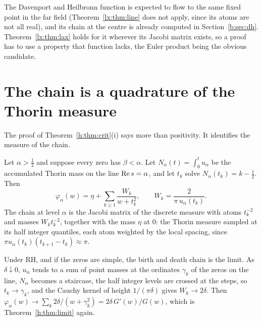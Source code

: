 The Davenport and Heilbronn function is expected to flow to the same fixed point in the far field (Theorem~\ref{lx:thm:line} does not apply, since its atoms are not all real), and its chain at the centre is already computed in Section~\ref{b:sec:dh}. Theorem~\ref{lx:thm:lax} holds for it wherever its Jacobi matrix exists, so a proof has to use a property that function lacks, the Euler product being the obvious candidate.

\section{The chain is a quadrature of the Thorin measure}

The proof of Theorem~\ref{h:thm:crit}(i) says more than positivity. It identifies the measure of the chain.

\begin{theorem}[Quadrature]\label{h:thm:quad}
Let $\alpha>\frac12$ and suppose every zero has $\beta<\alpha$. Let $N_\alpha(t)=\int_0^tu_\alpha$ be the accumulated Thorin mass on the line $\operatorname{Re} s=\alpha$, and let $t_k$ solve $N_\alpha(t_k)=k-\frac12$. Then
\[
\varphi_\alpha(w)=\eta+\sum_{k\ge1}\frac{W_k}{w+t_k^2},\qquad W_k=\frac{2}{\pi\,u_\alpha(t_k)} .
\]
The chain at level $\alpha$ is the Jacobi matrix of the discrete measure with atoms $t_k^{-2}$ and masses $W_kt_k^{-2}$, together with the mass $\eta$ at $0$: the Thorin measure sampled at its half integer quantiles, each atom weighted by the local spacing, since $\pi u_\alpha(t_k)(t_{k+1}-t_k)\approx\pi$.
\end{theorem}

Under RH, and if the zeros are simple, the birth and death chain is the limit. As $\delta\downarrow0$, $u_\alpha$ tends to a sum of point masses at the ordinates $\gamma_k$ of the zeros on the line, $N_\alpha$ becomes a staircase, the half integer levels are crossed at the steps, so $t_k\to\gamma_k$, and the Cauchy kernel of height $1/(\pi\delta)$ gives $W_k\to2\delta$. Then $\varphi_\alpha(w)\to\sum_k2\delta/(w+\gamma_k^2)=2\delta\,G'(w)/G(w)$, which is Theorem~\ref{h:thm:limit} again.

